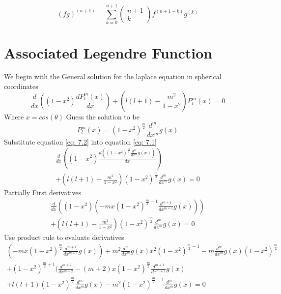 \documentclass[12pt]{article}
\begin{document}
    \begin{equation} \label{eq: 6.8}
        {(fg)}^{(n+1)} = \sum_{k=0}^{n+1} \begin{pmatrix} n+1\\ k \end{pmatrix} f^{(n+1-k)} g^{(k)}
    \end{equation}


\section{Associated Legendre Function}
    We begin with the General solution for the laplace equation in spherical coordinates
    \begin{equation} \label{eq: 7.1}
        \frac{d}{dx} \left((1-x^2) \frac{dP_l^m(x)}{dx}\right) + \left(l(l+1) - \frac{m^2}{1-x^2}\right) P_l^m(x) = 0
    \end{equation}
    Where $x=cos(\theta)$
    \newline Guess the solution to be 
    \begin{equation} \label{eq: 7.2}
        P_l^m(x) = {(1-x^2)}^{\frac{m}{2}} \frac{d^m}{dx^m} g(x)
    \end{equation}
    Substitute equation \ref{eq: 7.2} into equation \ref{eq: 7.1}
    \begin{equation} \label{eq: 7.3}
        \begin{split}
        \frac{d}{dx} \left((1-x^2) \frac{d\left({(1-x^2)}^{\frac{m}{2}} \frac{d^m}{dx^m} g(x)\right)}{dx}\right) 
        \\+ \left(l(l+1) - \frac{m^2}{1-x^2}\right) {(1-x^2)}^{\frac{m}{2}} \frac{d^m}{dx^m} g(x) = 0
        \end{split}
    \end{equation}
    Partially First derivatives
    \begin{equation} \label{eq: 7.4}
        \begin{split}        
        \frac{d}{dx} \left((1-x^2) \left(-mx{(1-x^2)}^{\frac{m}{2}-1} \frac{d^{m+1}}{dx^{m+1}} g(x)\right)\right) 
        \\+ \left(l(l+1) - \frac{m^2}{1-x^2}\right) {(1-x^2)}^{\frac{m}{2}} \frac{d^m}{dx^m} g(x) = 0
        \end{split}
    \end{equation}
    Use product rule to evaluate derivatives
    \begin{equation} \label{eq: 7.5}
        \begin{split}
        \left(-mx{(1-x^2)}^{\frac{m}{2}} \frac{d^{m+1}}{dx^{m+1}} g(x)\right) + m^2 \frac{d^m}{dx^m}g(x) x^2 {(1-x^2)}^{\frac{m}{2}-1} - m \frac{d^m}{dx^m} g(x) {(1-x^2)}^{\frac{m}{2}} 
        \\+ {(1-x^2)}^{\frac{m}{2}+1} (\frac{d^{m+2}}{dx^{m+2}} - (m+2) x {(1-x^2)}^{\frac{m}{2}} \frac{d^{m+1}}{dx^{m+1}} g(x) 
        \\+ l(l+1){(1-x^2)}^{\frac{m}{2}} \frac{d^m}{dx^m} g(x) - m^2 {(1-x^2)}^{\frac{m}{2}-1} \frac{d^m}{dx^m} g(x) = 0
        \end{split}
    \end{equation}
\end{document}
